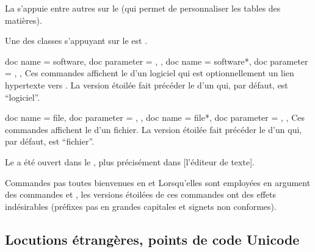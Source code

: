 \documentclass{letgut}
\begin{document}
\begin{ltx-code-result}[title addon=packages et classes,listing options app={deletekeywords={[4]{tables}}}]
La  s'appuie entre autres sur le 
(qui permet de personnaliser les tables des matières).

Une des classes s'appuyant sur le  est
.
\end{ltx-code-result}

\begin{docCommands}
  {
    {
      doc name = software,
      doc parameter = ,
    },
    {
      doc name = software*,
      doc parameter = ,
    },
  }
  Ces commandes affichent le  d'un logiciel qui est optionnellement un
  lien hypertexte vers .  La version étoilée fait précéder le
   d'un  qui, par défaut, est \enquote{logiciel}.
\end{docCommands}

\begin{docCommands}
  {
    {
      doc name = file,
      doc parameter = ,
    },
    {
      doc name = file*,
      doc parameter = ,
    },
  }
  Ces commandes affichent le  d'un fichier.  La version étoilée fait
  précéder le  d'un  qui, par défaut, est
  \enquote{fichier}.
\end{docCommands}

\begin{ltx-code-result}[title addon=logiciels et fichiers,listing options app={deletekeywords={[3]{file,plus,l,tex}}}]
Le  a été ouvert dans le
, plus
précisément dans [l'éditeur de texte].
\end{ltx-code-result}

\begin{dbwarning}{Commandes pas toutes bienvenues en  et
    }{}
  Lorsqu'elles sont employées en argument des commandes  et
  , les versions étoilées de ces commandes ont des effets
  indésirables (préfixes pas en grandes capitales et signets non conformes).
\end{dbwarning}

\subsection{Locutions étrangères, points de code Unicode}
\end{document}
